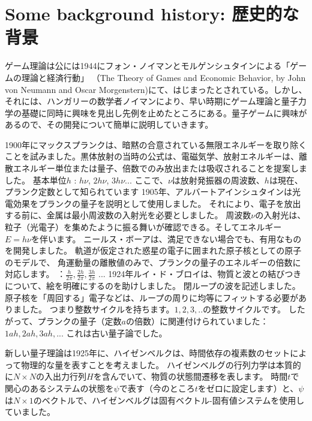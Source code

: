 
\section{Some background history: 歴史的な背景}

ゲーム理論は公には1944にフォン・ノイマンとモルゲンシュタインによる「ゲームの理論と経済行動」
（The Theory of Games and Economic Behavior, by John von Neumann and Oscar Morgenstern)にて、はじまったとされている。しかし、それには、ハンガリーの数学者ノイマンにより、早い時期にゲーム理論と量子力学の基礎に同時に興味を見出し先例を止めたところにある。量子ゲームに興味があるので、その開発について簡単に説明していきます。


1900年にマックスプランクは、暗黙の合意されている無限エネルギーを取り除くことを試みました。黒体放射の当時の公式は、電磁気学、放射エネルギーは、離散エネルギー単位または量子、倍数でのみ放出または吸収されることを提案しました。
基本単位$h$ : $h \nu$, $2h \nu$, $3h \nu$...
ここで、$\nu$は放射発振器の周波数、$h$は現在、プランク定数として知られています
1905年、アルバートアインシュタインは光電効果をプランクの量子を説明として使用しました。
それにより、電子を放出する前に、金属は最小周波数の入射光を必要としました。
周波数$\nu$の入射光は、粒子（光電子）を集めたように振る舞いが確認できる。そしてエネルギー $E = h \nu$を伴います。
ニールス・ボーアは、満足できない場合でも、有用なものを開発しました。
軌道が仮定された惑星の電子に囲まれた原子核としての原子のモデルで、
角運動量の離散値のみで、プランクの量子のエネルギーの倍数に対応します。
：$ \frac{h}{2 \pi}, \frac{2h}{2 \pi},\frac{3h}{2 \pi} $ ...
1924年ルイ・ド・ブロイは、物質と波との結びつきについて、絵を明確にするのを助けしました。
閉ループの波を記述しました。
原子核を「周回する」電子などは、ループの周りに均等にフィットする必要がありました。
つまり整数サイクルを持ちます。$1,2,3,..$の整数サイクルです。
したがって、プランクの量子（定数$a$の倍数）に関連付けられていました：$1ah,2ah,3ah,...$ これは古い量子論でした。

新しい量子理論は1925年に、ハイゼンベルクは、時間依存の複素数のセットによって物理的な量を表すことを考えました。
ハイゼンベルグの行列力学は本質的に$N \times N$の入出力行列$H$を含んでいて、物質の状態間遷移を表します。
時間$t$で関心のあるシステムの状態を$\psi$で表す（今のところ$t$をゼロに設定します）と、$\psi$は$N \times 1$のベクトルで、ハイゼンベルグは固有ベクトル-固有値システムを使用していました。

